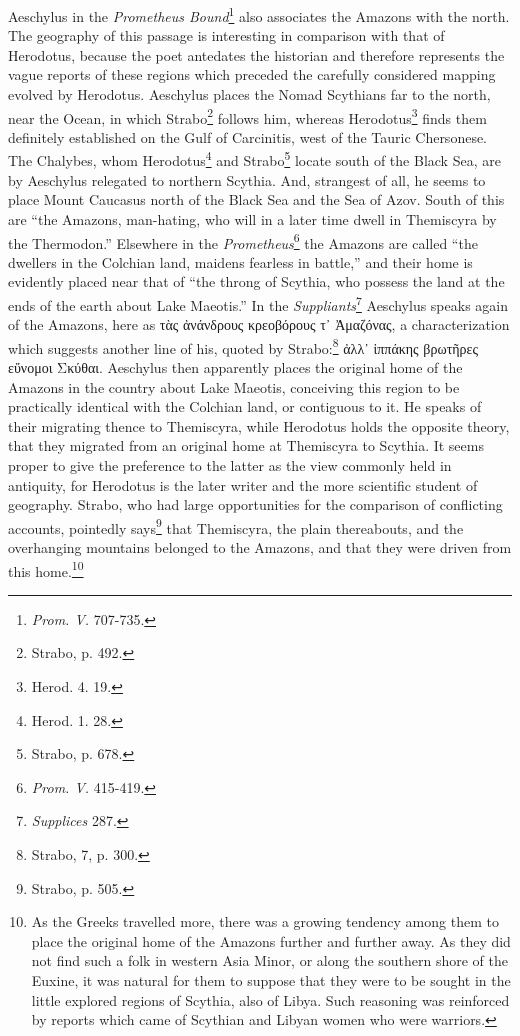 \documentclass[a4paper, 12pt, oneside]{article}
\begin{document}
Aeschylus in the \emph{Prometheus Bound}\footnote{\emph{Prom. V.} 707-735.} also associates the Amazons with the north. The geography of this passage is interesting in comparison with that of Herodotus, because the poet antedates the historian and therefore represents the vague reports of these regions which preceded the carefully considered mapping evolved by Herodotus. Aeschylus places the Nomad Scythians far to the north, near the Ocean, in which Strabo\footnote{Strabo, p. 492.} follows him, whereas Herodotus\footnote{Herod. 4. 19.} finds them definitely established on the Gulf of Carcinitis, west of the Tauric Chersonese. The Chalybes, whom Herodotus\footnote{Herod. 1. 28.} and Strabo\footnote{Strabo, p. 678.} locate south of the Black Sea, are by Aeschylus relegated to northern Scythia. And, strangest of all, he seems to place Mount Caucasus north of the Black Sea and the Sea of Azov. South of this are ``the Amazons, man-hating, who will in a later time dwell in Themiscyra by the Thermodon.'' Elsewhere in the \emph{Prometheus}\footnote{\emph{Prom. V.} 415-419.} the Amazons are called ``the dwellers in the Colchian land, maidens fearless in battle,'' and their home is evidently placed near that of ``the throng of Scythia, who possess the land at the ends of the earth about Lake Maeotis.'' In the \emph{Suppliants}\footnote{\emph{Supplices} 287.} Aeschylus speaks again of the Amazons, here as τὰς ἀνάνδρους κρεοβόρους τ᾽ Ἀμαζόνας, a characterization which suggests another line of his, quoted by Strabo:\footnote{Strabo, 7, p. 300.} ἀλλ᾽ ἱππάκης βρωτῆρες εὔνομοι Σκύθαι. Aeschylus then apparently places the original home of the Amazons in the country about Lake Maeotis, conceiving this region to be practically identical with the Colchian land, or contiguous to it. He speaks of their migrating thence to Themiscyra, while Herodotus holds the opposite theory, that they migrated from an original home at Themiscyra to Scythia. It seems proper to give the preference to the latter as the view commonly held in antiquity, for Herodotus is the later writer and the more scientific student of geography. Strabo, who had large opportunities for the comparison of conflicting accounts, pointedly says\footnote{Strabo, p. 505.} that Themiscyra, the plain thereabouts, and the overhanging mountains belonged to the Amazons, and that they were driven from this home.\footnote{As the Greeks travelled more, there was a growing tendency among them to place the original home of the Amazons further and further away. As they did not find such a folk in western Asia Minor, or along the southern shore of the Euxine, it was natural for them to suppose that they were to be sought in the little explored regions of Scythia, also of Libya. Such reasoning was reinforced by reports which came of Scythian and Libyan women who were warriors.}
\end{document}
